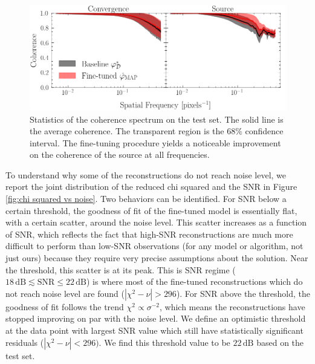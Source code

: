 \begin{figure}[t!]
        \centering
        \includegraphics[width=0.7\linewidth]{figures/coherence_spectrum}
        \caption{Statistics of the coherence spectrum on the test set. The solid line is the average 
        coherence. The transparent region is the $68\%$ confidence interval. The fine-tuning 
        procedure yields a noticeable improvement on the coherence of the source at all frequencies.}
        \label{fig:coherence}
\end{figure}


To understand why some of the reconstructions do not reach noise level, we 
report the joint distribution of the reduced chi squared and the SNR in Figure \ref{fig:chi squared vs noise}.
Two behaviors can be identified. For SNR below a certain threshold, the goodness of fit 
of the fine-tuned model is essentially flat, with a certain scatter, around the noise level. 
This scatter increases as a function of SNR, which reflects the fact that high-SNR reconstructions are much more difficult to perform than low-SNR observations (for any model or algorithm, not just ours) because they require very precise assumptions about the solution. 
Near the threshold, this scatter is at its peak. This is SNR regime ($18\,\mathrm{dB} \lesssim \mathrm{SNR} \leq 22\,\mathrm{dB}$) is where most of the fine-tuned reconstructions which do not reach noise level are found ($|\chi^2 - \nu| > 296$).
For SNR above the threshold, 
the goodness of fit follows the trend $\chi^2 \propto \sigma^{-2}$, which 
means the reconstructions have stopped improving on par with the noise level.
We define an optimistic threshold at the data point with largest 
SNR value which still have statistically significant residuals ($|\chi^2 - \nu| < 296)$. We 
find this threshold value to be $22\, \mathrm{dB}$ based on the test set. 

